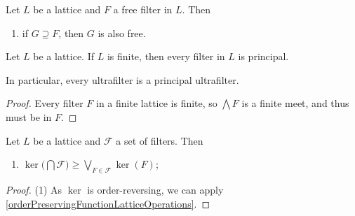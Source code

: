 \begin{lemma}
Let $L$ be a lattice and $F$ a free filter in $L$. Then
\begin{enumerate}
\item if $G\supseteq F$, then $G$ is also free.
\end{enumerate}
\end{lemma}

\begin{lemma} \label{finiteFiltersPrincipal}
Let $L$ be a lattice. If $L$ is finite, then every filter in $L$ is principal.
\end{lemma}
In particular, every ultrafilter is a principal ultrafilter.
\begin{proof}
Every filter $F$ in a finite lattice is finite, so $\bigwedge F$ is a finite meet, and thus must be in $F$.
\end{proof}

\begin{proposition}
Let $L$ be a lattice and $\mathcal{F}$ a set of filters. Then
\begin{enumerate}
\item $\ker\Big(\bigcap\mathcal{F}\Big) \geq \bigvee_{F\in\mathcal{F}} \ker(F)$;
\end{enumerate}
\end{proposition}
\begin{proof}
(1) As $\ker$ is order-reversing, we can apply \ref{orderPreservingFunctionLatticeOperations}. 
\end{proof}

